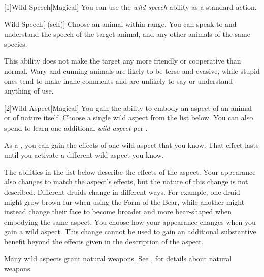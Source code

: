         [1]{Wild Speech}[Magical] You can use the \textit{wild speech} ability as a standard action.
        \begin{attuneability}{Wild Speech}[ (self)]
            Choose an animal within \rnglong range.
            You can speak to and understand the speech of the target animal, and any other animals of the same species.

            This ability does not make the target any more friendly or cooperative than normal.
            Wary and cunning animals are likely to be terse and evasive, while stupid ones tend to make inane comments and are unlikely to say or understand anything of use.
        \end{attuneability}

        [2]{Wild Aspect}[Magical]
        You gain the ability to embody an aspect of an animal or of nature itself.
        Choose a single wild aspect from the list below.
        You can also spend  to learn one additional \textit{wild aspect} per .

        As a , you can gain the effects of one wild aspect that you know.
        That effect lasts until you activate a different wild aspect you know.

        The abilities in the list below describe the effects of the aspect.
        Your appearance also changes to match the aspect's effects, but the nature of this change is not described.
        Different druids change in different ways.
        For example, one druid might grow brown fur when using the Form of the Bear, while another might instead change their face to become broader and more bear-shaped when embodying the same aspect.
        You choose how your appearance changes when you gain a wild aspect.
        This change cannot be used to gain an additional substantive benefit beyond the effects given in the description of the aspect.

        Many wild aspects grant natural weapons.
        See , for details about natural weapons.

